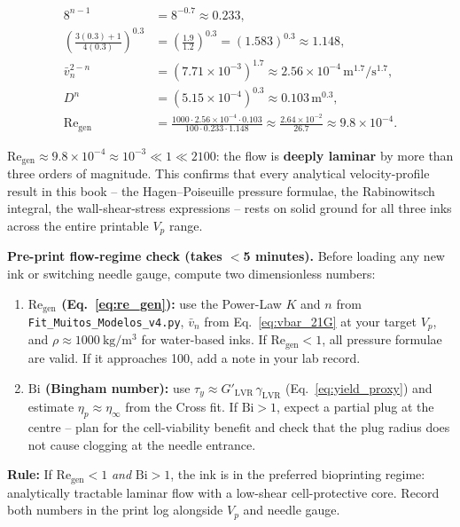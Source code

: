 \documentclass[11pt,a4paper]{article}
\newcommand{\Bi}{\mathrm{Bi}}
\newcommand{\Rey}{\mathrm{Re}}
\begin{document}
\begin{derivationbox}[title={DERIVATION --- Generalised (Metzner--Reed) Reynolds number}]
\begin{align*}
8^{n-1} &= 8^{-0.7} \approx 0.233, \\
\left(\frac{3(0.3)+1}{4(0.3)}\right)^{0.3}
  &= \left(\frac{1.9}{1.2}\right)^{0.3}
   = (1.583)^{0.3} \approx 1.148, \\
\bar v_n^{2-n} &= (7.71\times10^{-3})^{1.7}
   \approx 2.56\times10^{-4}\,\si{\m^{1.7}/\s^{1.7}}, \\
D^n &= (5.15\times10^{-4})^{0.3}
  \approx 0.103\,\si{\m^{0.3}}, \\
\Rey_\mathrm{gen}
  &= \frac{1000\cdot 2.56\times10^{-4}\cdot 0.103}
          {100\cdot 0.233 \cdot 1.148}
   \approx \frac{2.64\times10^{-2}}{26.7}
   \approx 9.8\times10^{-4}.
\end{align*}

$\Rey_\mathrm{gen}\approx 9.8\times10^{-4}\approx 10^{-3}\ll 1 \ll 2100$: the flow is
\textbf{deeply laminar} by more than three orders of magnitude. This
confirms that every analytical velocity-profile result in this book --
the Hagen--Poiseuille pressure formulae, the Rabinowitsch integral,
the wall-shear-stress expressions -- rests on solid ground for all three
inks across the entire printable $V_p$ range.
\end{derivationbox}

\begin{inpracticebox}
\textbf{Pre-print flow-regime check (takes $<$5 minutes).}
Before loading any new ink or switching needle gauge, compute two
dimensionless numbers:
\begin{enumerate}[leftmargin=1.6em,itemsep=3pt]
  \item \textbf{$\Rey_\mathrm{gen}$ (Eq.~\ref{eq:re_gen}):}
    use the Power-Law $K$ and $n$ from \texttt{Fit\_Muitos\_Modelos\_v4.py},
    $\bar v_n$ from Eq.~\ref{eq:vbar_21G} at your target $V_p$, and
    $\rho\approx\SI{1000}{\kg/\m^3}$ for water-based inks. If
    $\Rey_\mathrm{gen}<1$, all pressure formulae are valid. If it
    approaches 100, add a note in your lab record.

  \item \textbf{$\Bi$ (Bingham number):}
    use $\tau_y \approx G'_\mathrm{LVR}\,\gamma_\mathrm{LVR}$
    (Eq.~\ref{eq:yield_proxy}) and estimate $\eta_p \approx \eta_\infty$
    from the Cross fit. If $\Bi>1$, expect a partial plug at the centre --
    plan for the cell-viability benefit and check that the plug radius
    does not cause clogging at the needle entrance.
\end{enumerate}
\textbf{Rule:} If $\Rey_\mathrm{gen}<1$ \emph{and} $\Bi>1$, the ink is in
the preferred bioprinting regime: analytically tractable laminar flow with
a low-shear cell-protective core. Record both numbers in the print log
alongside $V_p$ and needle gauge.
\end{inpracticebox}
\end{document}
